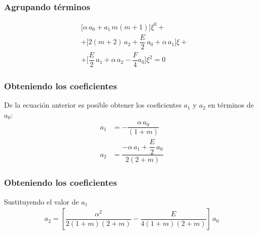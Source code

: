 \begin{frame}
\frametitle{Agrupando términos}
\vspace*{-1cm}
\begin{align*}
&\bigg[ \alpha \, a_{0} + a_{1} \, m (m+1)\bigg] \xi^{0} + \\[0.5em]
&+ \bigg[ 2 (m + 2) \, a_{2} + \dfrac{E}{2} \, a_{0} + \alpha \, a_{1} \bigg] \xi + \\[0.5em]
&+ \bigg[\dfrac{E}{2} \, a_{1} + \alpha \, a_{2} - \dfrac{F}{4} a_{0} \bigg] \xi^{2} = 0
\end{align*}
\end{frame}
\begin{frame}
\frametitle{Obteniendo los coeficientes}
De la ecuación anterior es posible obtener los coeficientes $a_{1}$ y $a_{2}$ en términos de $a_{0}$:
\begin{align*}
a_{1} &= - \dfrac{\alpha \, a_{0}}{(1{+}m)} \\[1em]
a_{2} &=  \dfrac{{-}\alpha \, a_{1} {+} \dfrac{E}{2} \, a_{0}}{2(2{+}m)}
\end{align*}
\end{frame}
\begin{frame}
\frametitle{Obteniendo los coeficientes}
Sustituyendo el valor de $a_{1}$
\begin{align*}
a_{2} =  \left[ \dfrac{\alpha^{2}}{2(1+m)(2+m)} - \dfrac{E}{4(1+m)(2+m)} \right] \, a_{0}
\end{align*}
\end{frame}
